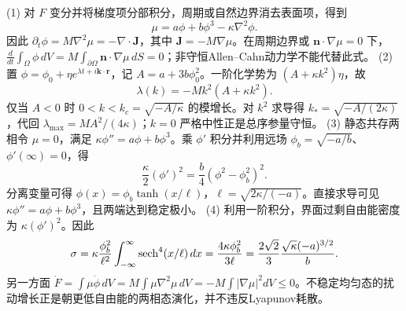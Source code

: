 (1) 对 \(F\) 变分并将梯度项分部积分，周期或自然边界消去表面项，得到
\[
\mu=a\phi+b\phi^3-\kappa\nabla^2\phi.
\]
因此 \(\partial_t\phi=M\nabla^2\mu=-\nabla\cdot\boldsymbol J\)，其中 \(\boldsymbol J=-M\nabla\mu\)。在周期边界或 \(\boldsymbol n\cdot\nabla\mu=0\) 下，\(\frac d{dt}\int_\Omega\phi\,dV=M\int_{\partial\Omega}\boldsymbol n\cdot\nabla\mu\,dS=0\)；非守恒Allen–Cahn动力学不能代替此式。
(2) 置 \(\phi=\phi_0+\eta e^{\lambda t+i\boldsymbol k\cdot\boldsymbol r}\)，记 \(A=a+3b\phi_0^2\)。一阶化学势为 \((A+\kappa k^2)\eta\)，故
\[
\lambda(k)=-Mk^2(A+\kappa k^2).
\]
仅当 \(A<0\) 时 \(0<k<k_c=\sqrt{-A/\kappa}\) 的模增长。对 \(k^2\) 求导得 \(k_*=\sqrt{-A/(2\kappa)}\)，代回 \(\lambda_{\max}=MA^2/(4\kappa)\)；\(k=0\) 严格中性正是总序参量守恒。
(3) 静态共存两相令 \(\mu=0\)，满足 \(\kappa\phi''=a\phi+b\phi^3\)。乘 \(\phi'\) 积分并利用远场 \(\phi_b=\sqrt{-a/b}\)、\(\phi'(\infty)=0\)，得
\[
\frac{\kappa}{2}(\phi')^2=\frac b4(\phi^2-\phi_b^2)^2.
\]
分离变量可得 \(\phi(x)=\phi_b\tanh(x/\ell)\)，\(\ell=\sqrt{2\kappa/(-a)}\)。直接求导可见 \(\kappa\phi''=a\phi+b\phi^3\)，且两端达到稳定极小。
(4) 利用一阶积分，界面过剩自由能密度为 \(\kappa(\phi')^2\)。因此
\[
\sigma=\kappa\frac{\phi_b^2}{\ell^2}\int_{-\infty}^{\infty}{\rm sech}^4(x/\ell)\,dx
=\frac{4\kappa\phi_b^2}{3\ell}
=\frac{2\sqrt2}{3}\frac{\sqrt\kappa(-a)^{3/2}}b.
\]
另一方面 \(\dot F=\int\mu\dot\phi\,dV=M\int\mu\nabla^2\mu\,dV=-M\int|\nabla\mu|^2dV\le0\)。不稳定均匀态的扰动增长正是朝更低自由能的两相态演化，并不违反Lyapunov耗散。
